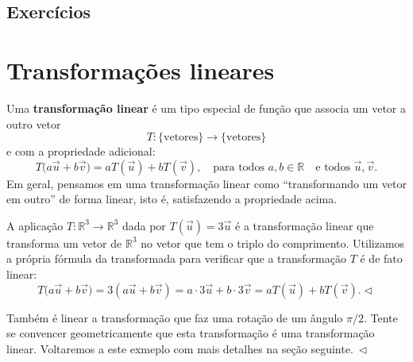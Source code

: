 \subsection*{Exercícios}

\construirExer


\section{Transformações lineares}


Uma \textbf{transformação linear} é um tipo especial de função que associa um vetor a outro vetor
\begin{equation}
T: \{ \text{vetores} \} \to \{ \text{vetores} \}
\end{equation} e com a propriedade adicional:
\begin{equation}
T\big( a \vec{u} + b \vec{v} \big) = aT(\vec{u}) + bT(\vec{v}), \quad \text{para todos } a, b \in \mathbb{R} \quad \text{e todos } \vec{u}, \vec{v}.
\end{equation}
Em geral, pensamos em uma transformação linear como ``transformando um vetor em outro'' de forma linear, isto é, satisfazendo a propriedade acima.


\begin{ex}
A aplicação $T: \mathbb{R}^3 \to \mathbb{R}^3$ dada por $T(\vec{u}) = 3\vec{u}$ é a transformação linear que transforma um vetor de $\mathbb{R}^3$ no vetor que tem o triplo do comprimento. Utilizamos a própria fórmula da transformada para verificar que a transformação $T$ é de fato linear:
\begin{equation}
T\big( a \vec{u} + b \vec{v} \big) = 3 ( a \vec{u} + b \vec{v} ) = a \cdot 3 \vec{u} + b \cdot 3 \vec{v} = aT(\vec{u}) + bT(\vec{v}). \lhd
\end{equation}
\end{ex}


\begin{ex}\label{exp:4}
Também é linear a transformação que faz uma rotação de um ângulo $\pi / 2$. Tente se convencer geometricamente que esta transformação é uma transformação linear. Voltaremos a este exmeplo com mais detalhes na seção seguinte$. \ \lhd$
\end{ex}



